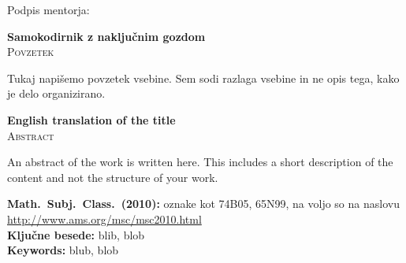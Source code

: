 \documentclass[12pt,a4paper,twoside]{article}
\newcommand{\naslovdela}{Samokodirnik z naključnim gozdom}
\newcommand{\kljucnebesede}{blib\sep blob} %
\newcommand{\keywords}{blub\sep blob} %
\newcommand{\sep}{, }  %
\theoremstyle{definition} %
\theoremstyle{plain} %
\numberwithin{equation}{section}  %
\begin{document}
\vspace{2cm}
\hspace*{\fill} Podpis mentorja: \phantom{prostor za podpis}


\cleardoublepage
{}

\begin{center}
\textbf{\naslovdela} \\[3mm]
\textsc{Povzetek} \\[2mm]
\end{center}
Tukaj napišemo povzetek vsebine. Sem sodi razlaga vsebine in ne opis tega, kako je delo
organizirano.

\vfill
\begin{center}
\textbf{English translation of the title} \\[3mm] %
\textsc{Abstract}\\[2mm]
\end{center}

An abstract of the work is written here. This includes a short description of
the content and not the structure of your work.

\vfill\noindent
\textbf{Math.~Subj.~Class.~(2010):} oznake kot 74B05, 65N99, na voljo so na naslovu
\url{http://www.ams.org/msc/msc2010.html} \\[1mm]
\textbf{Ključne besede:} \kljucnebesede \\[1mm]
\textbf{Keywords:} \keywords

\cleardoublepage

\setcounter{page}{1}    %



\end{document}

